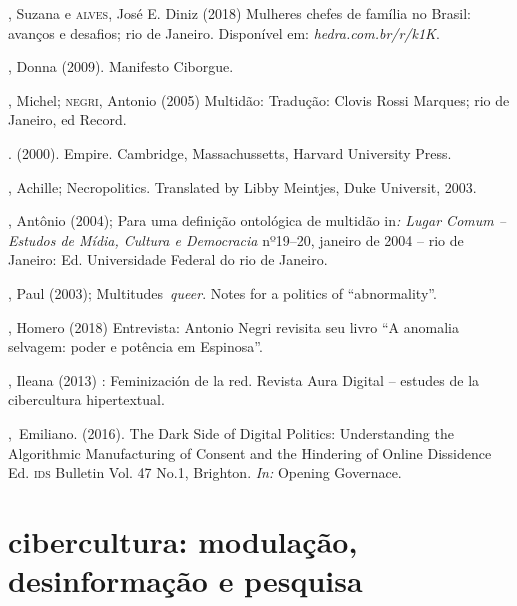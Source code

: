 \begin{bibliohedra}
, Suzana e \textsc{alves}, José E. Diniz (2018) Mulheres chefes de
família no Brasil: avanços e desafios; rio de Janeiro. Disponível em: \textit{hedra.com.br/r/k1K}.

, Donna (2009). Manifesto Ciborgue. 

, Michel; \textsc{negri}, Antonio (2005) Multidão: Tradução: Clovis Rossi
Marques; rio de Janeiro, ed Record.

\titidem. (2000). Empire. Cambridge,
Massachussetts, Harvard University Press.

, Achille; Necropolitics. Translated by Libby Meintjes, Duke
Universit, 2003. 

, Antônio (2004); Para uma definição ontológica de multidão
in\textit{: Lugar Comum -- Estudos de Mídia, Cultura e Democracia} nº19--20,
janeiro de 2004 -- rio de Janeiro: Ed. Universidade Federal do rio de
Janeiro.

, Paul (2003); Multitudes~\textit{queer}. Notes for a politics of
``abnormality''.

, Homero (2018) Entrevista: Antonio Negri revisita seu livro ``A
anomalia selvagem: poder e potência em Espinosa''.

, Ileana (2013) : Feminización de la red. Revista Aura
Digital -- estudes de la cibercultura hipertextual.

,~Emiliano. (2016). The Dark Side of Digital Politics:
Understanding the Algorithmic Manufacturing of Consent and the Hindering
of Online Dissidence Ed. \textsc{ids} Bulletin Vol. 47 No.1, Brighton. \textit{In:}
Opening Governace. 
\end{bibliohedra}

\part{cibercultura: modulação, desinformação e pesquisa}


